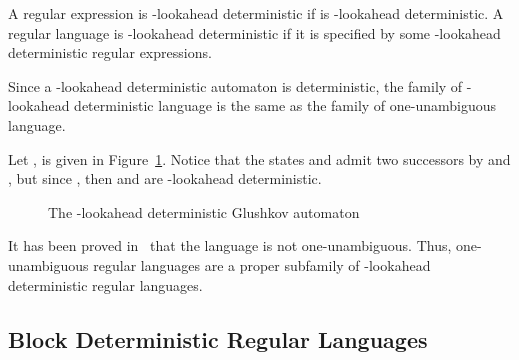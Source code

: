 \documentclass{llncs}
\begin{document}
\begin{definition}
	A regular expression  is -lookahead deterministic if  is -lookahead deterministic.
	A regular language is -lookahead deterministic if it is specified by some -lookahead deterministic regular expressions.
\end{definition}

	Since a -lookahead deterministic automaton is deterministic, the family of -lookahead deterministic language is the same as the family of one-unambiguous language.

\begin{example}
	Let ,  is given in Figure~\ref{fg:Glushkov2LA}.
	Notice that the states  and  admit two successors by  and , but since , then  and  are -lookahead deterministic. 
\end{example}


\begin{figure}[H]
	\centering
	

	\caption{The -lookahead deterministic Glushkov automaton }
	\label{fg:Glushkov2LA}
\end{figure}

	It has been proved in~\cite{HW08} that the language  is not one-unambiguous.
	Thus, one-unambiguous regular languages are a proper subfamily of -lookahead deterministic regular languages.
		
	
\subsection{Block Deterministic Regular Languages}
\end{document}
